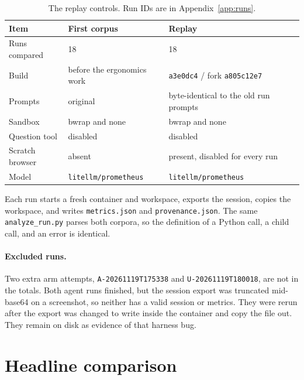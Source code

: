 \documentclass[11pt]{article}
\newcommand{\code}[1]{\texttt{#1}}
\begin{document}
\begin{table}[h]
\centering
\small
\begin{tabular}{@{}llll@{}}
\toprule
Item & First corpus & Replay \\
\midrule
Runs compared & 18 & 18 \\
Build & before the ergonomics work & \code{a3e0dc4} / fork \code{a805c12e7} \\
Prompts & original & byte-identical to the old run prompts \\
Sandbox & bwrap and none & bwrap and none \\
Question tool & disabled & disabled \\
Scratch browser & absent & present, disabled for every run \\
Model & \code{litellm/prometheus} & \code{litellm/prometheus} \\
\bottomrule
\end{tabular}
\caption{The replay controls. Run IDs are in Appendix~\ref{app:runs}.}
\end{table}

Each run starts a fresh container and workspace, exports the session, copies the
workspace, and writes \code{metrics.json} and \code{provenance.json}. The same
\code{analyze\_run.py} parses both corpora, so the definition of a Python call,
a child call, and an error is identical.

\paragraph{Excluded runs.}
Two extra arm attempts, \code{A-20261119T175338} and \code{U-20261119T180018},
are not in the totals. Both agent runs finished, but the session export was
truncated mid-base64 on a screenshot, so neither has a valid session or
metrics. They were rerun after the export was changed to write inside the
container and copy the file out. They remain on disk as evidence of that
harness bug.

\section{Headline comparison}
\end{document}
